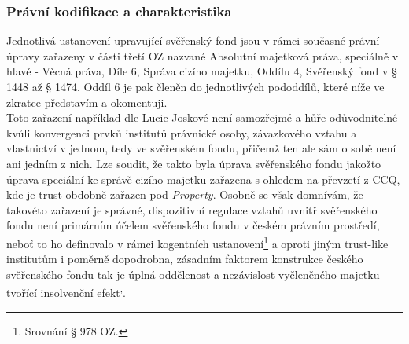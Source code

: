 \documentclass{article}
\begin{document}

\subsubsection{Právní kodifikace a charakteristika}

Jednotlivá ustanovení upravující svěřenský fond jsou v rámci současné právní úpravy zařazeny v části třetí OZ nazvané Absolutní majetková práva, speciálně v hlavě  \MakeUppercase{{}} - Věcná práva, Díle 6, Správa cizího majetku, Oddílu 4, Svěřenský fond v § 1448 až § 1474. Oddíl 6 je pak členěn do jednotlivých pododdílů, které níže ve zkratce představím a okomentuji. \\

Toto zařazení například dle Lucie Joskové není samozřejmé a hůře odůvodnitelné kvůli konvergenci prvků institutů právnické osoby, závazkového vztahu a vlastnictví v jednom, tedy ve svěřenském fondu, přičemž ten ale sám o sobě není ani jedním z nich. Lze soudit, že takto byla úprava svěřenského fondu jakožto úprava speciální ke správě cizího majetku zařazena s ohledem na převzetí z CCQ, kde je trust obdobně zařazen pod \textit{Property}. Osobně se však domnívám, že takovéto zařazení je správné, dispozitivní regulace vztahů uvnitř svěřenského fondu není primárním účelem svěřenského fondu v českém právním prostředí, neboť to ho definovalo v rámci kogentních ustanovení\footnote{Srovnání § 978 OZ.} a oproti jiným trust-like institutům i poměrně dopodrobna, zásadním faktorem konstrukce českého svěřenského fondu tak je úplná oddělenost a nezávislost vyčleněného majetku tvořící insolvenční efekt\textsuperscript{,}.\\


\end{document}
